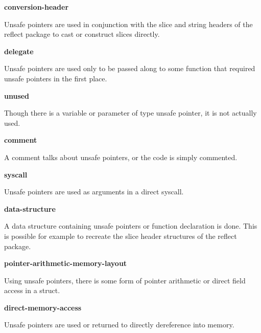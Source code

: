 


\textbf{conversion-header}

Unsafe pointers are used in conjunction with the slice and string headers of the reflect package to cast or construct
slices directly.




\textbf{delegate}

Unsafe pointers are used only to be passed along to some function that required unsafe pointers in the first place.




\textbf{unused}

Though there is a variable or parameter of type unsafe pointer, it is not actually used.




\textbf{comment}

A comment talks about unsafe pointers, or the code is simply commented.




\textbf{syscall}

Unsafe pointers are used as arguments in a direct syscall.




\textbf{data-structure}

A data structure containing unsafe pointers or function declaration is done.
This is possible for example to recreate the slice header structures of the reflect package.




\textbf{pointer-arithmetic-memory-layout}

Using unsafe pointers, there is some form of pointer arithmetic or direct field access in a struct.




\textbf{direct-memory-access}

Unsafe pointers are used or returned to directly dereference into memory.




